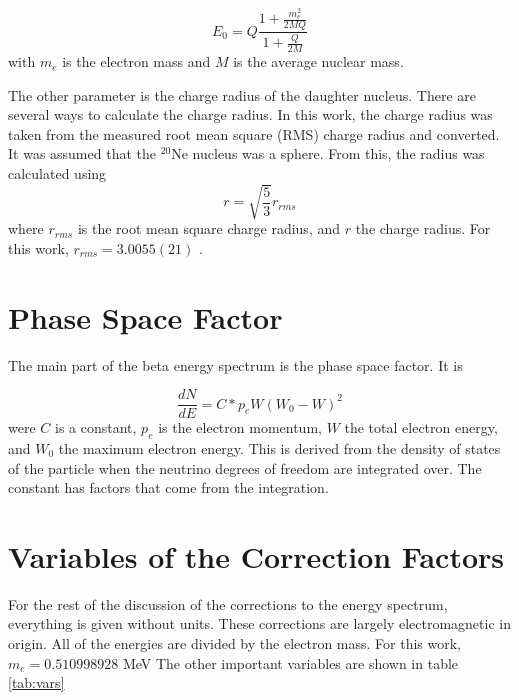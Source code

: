 \documentclass[../MaxHughesThesis.tex]{subfiles}
\begin{document}
\begin{equation}
	E_{0} = Q\frac{1 + \frac{m_{e}^{2}}{2MQ}}{1 + \frac{Q}{2M}} 
	\label{eq:recoilqval}
\end{equation} 
with $m_{e}$ is the electron mass and $M$ is the average nuclear mass. 

The other parameter is the charge radius of the daughter nucleus.
There are several ways to calculate the charge radius.
In this work, the charge radius was taken from the measured root mean square (RMS) charge radius and converted.
It was assumed that the $^{20}$Ne nucleus was a sphere. 
From this, the radius was calculated using %
\begin{equation}
	r = \sqrt{\frac{5}{3}}r_{rms}	
	\label{eq:sphereeq}
\end{equation}
where $r_{rms}$ is the root mean square charge radius, and $r$ the charge radius.
For this work, $r_{rms} = 3.0055 (21)$ \cite{Ang13}.

\section{Phase Space Factor}
The main part of the beta energy spectrum is the phase space factor.
It is %

\begin{equation}
	\frac{dN}{dE} = C * p_{e}W(W_{0} - W)^{2}
	\label{eq:phase_space}
\end{equation}
were $C$ is a constant, $p_{e}$ is the electron momentum, $W$ the total electron energy, and $W_{0}$ the maximum electron energy.
This is derived from the density of states of the particle when the neutrino degrees of freedom are integrated over.
The constant has factors that come from the integration.

\section{Variables of the Correction Factors}

For the rest of the discussion of the corrections to the energy spectrum, everything is given without units.
These corrections are largely electromagnetic in origin.
All of the energies are divided by the electron mass.
For this work, $m_{e} = 0.510998928$ MeV
The other important variables are shown in table \ref{tab:vars}
\end{document}
